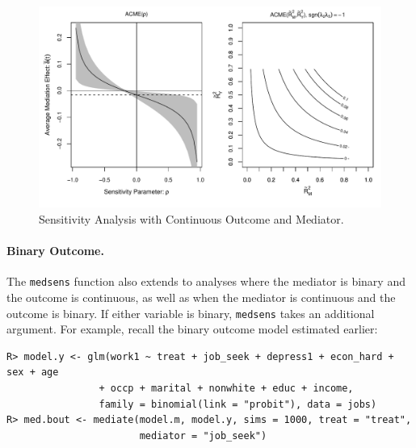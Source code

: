 \documentclass[11pt,letterpaper]{article}
\theoremstyle{plain}
\begin{document}
\begin{figure}[t]
\vspace{-.5in}
\begin{center}
\includegraphics[scale=.8]{Rho-R2-ContCont-JOBS.pdf}
\end{center}
\vspace{-.5in}
\caption{Sensitivity Analysis with Continuous Outcome and Mediator.
  \label{jobplot1}}
\end{figure}


\paragraph{Binary Outcome.}

The \texttt{medsens} function also extends to analyses where the
mediator is binary and the outcome is continuous, as well as when the
mediator is continuous and the outcome is binary.  If either variable
is binary, \texttt{medsens} takes an additional argument.  For
example, recall the binary outcome model estimated earlier:
\begin{verbatim}
R> model.y <- glm(work1 ~ treat + job_seek + depress1 + econ_hard + sex + age 
                + occp + marital + nonwhite + educ + income, 
                family = binomial(link = "probit"), data = jobs)
R> med.bout <- mediate(model.m, model.y, sims = 1000, treat = "treat",
                       mediator = "job_seek")
\end{verbatim}
\end{document}

